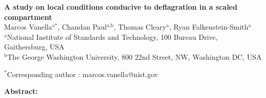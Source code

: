 \documentclass[12pt,letterpaper]{article}
\begin{document}
\begin{flushleft} %

\textbf{A study on local conditions conducive to deflagration in a scaled compartment}
\vspace{3mm}\\
%
Marcos Vanella$^\text{a*}$, Chandan Paul$^\text{a,b}$, Thomas Cleary$^\text{a}$, Ryan Falkenstein-Smith$^\text{a}$
\vspace{3mm}\\	

$^\text{a}$National Institute of Standards and Technology, 100 Bureau Drive, Gaithersburg, USA  \\
$^\text{b}$The George Washington University, 800 22nd Street, NW, Washington DC, USA  \\
\vspace{3mm}

$^*$Corresponding author : marcos.vanella@nist.gov


\textbf{Abstract:}

\vspace{3mm}



\end{flushleft}
\end{document}
